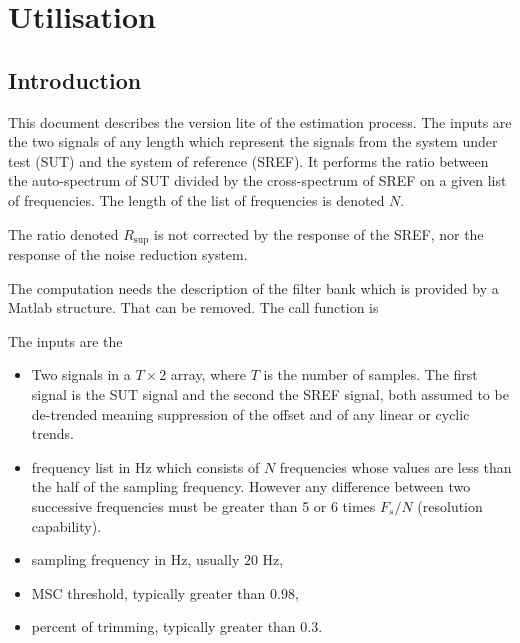 \documentclass[a4paper, 12pt]{report}
\begin{document}
 \sloppy
 
\tableofcontents

\chapter{Utilisation}

\section{Introduction}
This document describes the version lite of the estimation process. The inputs are the two signals of any length which represent the signals from the system under test (SUT) and the system of reference (SREF). It performs the ratio between the auto-spectrum of SUT divided by the cross-spectrum of SREF on a given list of frequencies. The length of the list of frequencies is denoted $N$.

The ratio denoted $R_{\sup}$ is not corrected by the response of the SREF, nor the response of the noise reduction system.

The computation needs the description of the filter bank which is provided by a Matlab structure. That can be removed. The call function is

{\tiny}

The inputs are the 
\begin{itemize}
\item
Two signals in a $T\times 2$ array, where $T$ is the number of samples. The first signal is the SUT signal and the second the SREF signal, both assumed to be de-trended meaning suppression of the offset and of any linear or cyclic trends.
\item
frequency list in Hz which consists of $N$ frequencies whose values are less than the half of the sampling frequency. However any difference  between two successive frequencies must be greater than 5 or 6 times $F_{s}/N$ (resolution capability).
\item
sampling frequency in Hz, usually $20$ Hz,
\item
MSC threshold, typically greater than $0.98$,
\item
percent of trimming, typically greater than $0.3$.
\end{itemize}
\end{document}
